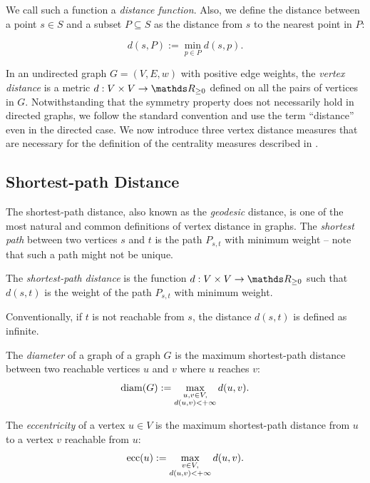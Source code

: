 We call such a function a \emph{distance function}.
Also, we define the distance between a point $s \in S$
and a subset $P \subseteq S$ as the distance from $s$ to the nearest point in
$P$:

\begin{equation}
\label{eq:def:dist-point-set}
d(s, P) := \min_{p \in P}d(s, p).
\end{equation}

In an undirected graph $G = (V, E, w)$ with positive edge weights,
the \emph{vertex distance} is a metric $d: V\times V \rightarrow \real_{\ge 0}$
defined on all the pairs of vertices in $G$.
Notwithstanding that the symmetry property does not necessarily hold in
directed graphs, we follow the standard convention and use the term
\enquote{distance} even in the directed case.
We now introduce three vertex distance measures that are necessary for the
definition of the centrality measures described in
.


%
\subsection{Shortest-path Distance}
%
The shortest-path distance, also known as the \emph{geodesic} distance,
is one of the most natural and common definitions of vertex distance in graphs.
The \emph{shortest path} between two vertices $s$ and $t$ is the path $P_{s,t}$
with minimum weight -- note that such a path might not be unique.

\begin{definition}
The \emph{shortest-path distance} is the function
$d : V \times V \rightarrow \real_{\ge 0}$ such that $d(s, t)$
is the weight of the path $P_{s,t}$ with minimum weight.
\end{definition}

Conventionally, if $t$ is not reachable from $s$, the distance $d(s, t)$ is
defined as infinite.

\begin{definition}[Diameter]
The \emph{diameter} of a graph of a graph $G$ is the maximum
shortest-path distance between two reachable vertices $u$ and $v$ where $u$
reaches $v$:
%
\[\text{diam}(G) := \max_{\substack{u,v\in V,\\d(u, v) < +\infty}}d(u, v).\]
\end{definition}

\begin{definition}[Eccentricity]
The \emph{eccentricity} of a vertex $u \in V$ is the maximum shortest-path
distance from $u$ to a vertex $v$ reachable from $u$:
\[\text{ecc}(u) := \max_{\substack{v\in V,\\d(u, v) < +\infty}} d(u, v).\]
\end{definition}


